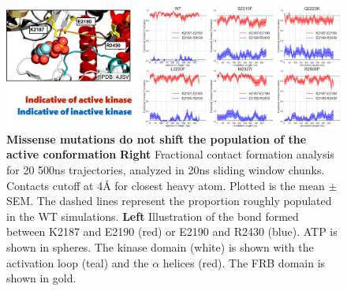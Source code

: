 \documentclass[phd,tocprelim]{cornell}
\begin{document}
\begin{landscape}
	\begin{figure}[p]
		\centering
		\includegraphics[width=1.0\linewidth]{figures/mtor-fig5.pdf}
		\caption[Missense mutations do not shift the population of the active conformation]{
			{\bf Missense mutations do not shift the population of the active conformation}
			{\bf Right} Fractional contact formation analysis for 20 500ns trajectories, analyzed in 20ns sliding window chunks. Contacts cutoff at 4Å for closest heavy atom.  Plotted is the mean $\pm$ SEM. The dashed lines represent the proportion roughly populated in the WT simulations. {\bf Left} Illustration of the bond formed between K2187 and E2190 (red) or E2190 and R2430 (blue). ATP is shown in spheres. The kinase domain (white) is shown with the activation loop (teal) and the $\alpha$ helices (red). The FRB domain is shown in gold. 
			}
		\label{fig:mtor-figure5}
	\end{figure}
\end{landscape}
\end{document}
